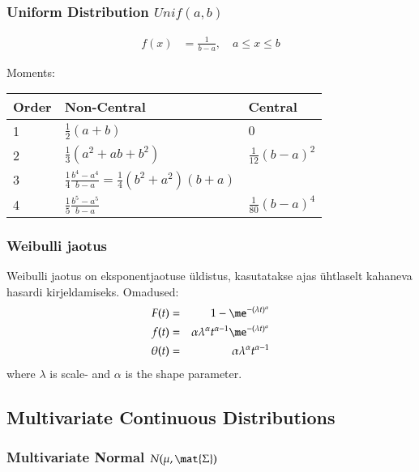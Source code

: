 \documentclass[a4paper]{article}
\numberwithin{equation}{subsection}
\begin{document}
\subsubsection{Uniform Distribution $Unif(a,b)$}

\begin{align}
f(x) &= \frac{1}{b - a}, \quad a \le x \le b
\end{align}

Moments:
\begin{center}
  \begin{tabular}{lll}
    \toprule
    Order & Non-Central & Central\\
    \midrule
    1 & $\frac{1}{2}(a + b)$ & $0$ \\[1.2ex]
    2 & $\frac{1}{3}(a^{2} + ab + b^{2})$ & $\frac{1}{12}(b - a)^{2}$
    \\[1.2ex]
    3 & $\displaystyle \frac{1}{4}\frac{b^{4} - a^{4}}{b-a} =
        \frac{1}{4}(b^{2} + a^{2})(b + a)$ \\[1.3ex]
    4 & $\displaystyle \frac{1}{5}\frac{b^{5} - a^{5}}{b-a}$ & $ \frac{1}{80}(b - a)^{4}$ \\
    \bottomrule
  \end{tabular}
\end{center}


\subsubsection{Weibulli jaotus}
Weibulli jaotus on eksponentjaotuse üldistus, kasutatakse ajas
ühtlaselt kahaneva hasardi kirjeldamiseks.  Omadused:
\begin{eqnarray}
  F(t) &=& 1 - \me^{-(\lambda t)^\alpha}
  \\
  f(t) &=& \alpha \lambda^\alpha t^{\alpha - 1}
  \me^{-(\lambda t)^\alpha}\\
  \theta(t) &=& \alpha \lambda^\alpha t^{\alpha - 1}
\end{eqnarray}
where $\lambda$ is scale- and $\alpha$ is the shape parameter.


\clearpage
\subsection{Multivariate Continuous Distributions}

\subsubsection{Multivariate Normal $N(\mu, \mat{\Sigma})$}
\end{document}
